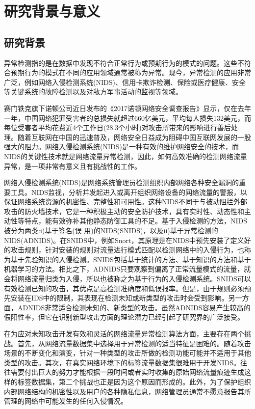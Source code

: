 \section{研究背景与意义}
\subsection{研究背景}

异常检测指的是在数据中发现不符合正常行为或预期行为的模式的问题。这些不符合预期行为的模式在不同的应用领域通常被称为异常。现今，异常检测的应用非常广泛，例如网络入侵检测系统(NIDS)、信用卡欺诈检测、保险或医疗健康、安全等关键系统的故障检测以及对敌方军事活动的监视等领域。

赛门铁克旗下诺顿公司近日发布的《2017诺顿网络安全调查报告》显示，仅在去年一年，中国网络犯罪受害者的总损失就超过660亿美元，平均每人损失132美元，而每位受害者平均花费近4个工作日(28.3个小时)对攻击所带来的影响进行善后处理。随着互联网在中国的迅速普及，网络安全日益成为阻碍中国互联网发展的一股强大的阻力。网络入侵检测系统(NIDS)是一种有效的维护网络安全的技术，而NIDS的关键性技术就是网络流量异常检测，因此，如何高效准确的检测网络流量异常，是一项非常有意义且有挑战性的工作。

网络入侵检测系统(NIDS)是网络系统管理员检测组织内部网络各种安全漏洞的重要工具。NIDS监视，分析并发起进入或离开组织网络设备的网络流量的警报，以保证网络系统资源的机密性、完整性和可用性。这种NIDS不同于与被动阻拦外部攻击的防火墙技术，它是一种积极主动的安全防护技术，具有实时性、动态性和主动性等特点，能有效弥补其他静态防御工具的不足。基于入侵检测的方法，NIDS被分为两类:i)基于签名(误 用)的NIDS(SNIDS)，以及ii)基于异常检测的NIDS(ADNIDS)。在SNIDS中，例如Snort，其原理是在NIDS中预先安装了定义好的攻击规则，针对安装的规则对流量进行模式匹配以检测网络中的入侵行为，也称为基于先验知识的入侵检测。SNIDS包括基于统计的方法、基于知识的方法和基于机器学习的方法。相比之下，ADNIDS只要观察到偏离了正常流量模式的流量，就会将网络流量归类为入侵，所以也被称之为基于行为的入侵检测系统。SNIDS可以有效检测已知的攻击，其优点是高检测准确度和低误报率。但是，由于规则必须预先安装在IDS中的限制，其表现在检测未知或新类型的攻击时会受到影响。另一方面，ADNIDS非常适合检测未知的、新类型的攻击。虽然ADNIDS容易产生较高的假阳性率，但它在识别新型攻击方面的理论潜力已经引起了研究界的广泛接受。

在为应对未知攻击开发有效和灵活的网络流量异常检测算法方面，主要存在两个挑战。首先，从网络流量数据集中选择用于异常检测的适当特征是困难的。随着攻击场景的不断变化和演变，针对一种类型的攻击所做的检测功能可能并不适用于其他类型的攻击。其次，在真实网络环境下的标签流量数据集很难用于开发NIDS。往往需要付出巨大的努力才能根据一段时间或者实时收集的原始网络流量痕迹生成这样的标签数据集，第二个挑战也正是因为这个原因而形成的。此外，为了保护组织内部网络结构的机密性以及用户的各种隐私信息，网络管理员通常不愿意报告其所管理的网络中可能发生的任何入侵情况。

